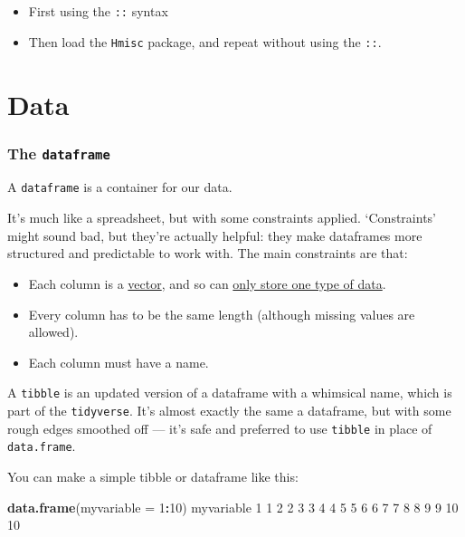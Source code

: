 \documentclass[]{article}
\newenvironment{Shaded}{\begin{snugshade}}{\end{snugshade}}
\newcommand{\DataTypeTok}[1]{\textcolor[rgb]{0.13,0.29,0.53}{#1}}
\newcommand{\DecValTok}[1]{\textcolor[rgb]{0.00,0.00,0.81}{#1}}
\newcommand{\KeywordTok}[1]{\textcolor[rgb]{0.13,0.29,0.53}{\textbf{#1}}}
\newcommand{\NormalTok}[1]{#1}
\newcommand{\OperatorTok}[1]{\textcolor[rgb]{0.81,0.36,0.00}{\textbf{#1}}}
\providecommand{\tightlist}{%
  \setlength{\itemsep}{0pt}\setlength{\parskip}{0pt}}
\begin{document}
\begin{itemize}
\tightlist
\item
  First using the \texttt{::} syntax
\item
  Then load the \texttt{Hmisc} package, and repeat without using the \texttt{::}.
\end{itemize}

\hypertarget{data}{%
\part{Data}\label{data}}

\hypertarget{datasets-dataframes}{%
\section{\texorpdfstring{The \texttt{dataframe}}{The dataframe}}\label{datasets-dataframes}}

A \texttt{dataframe} is a container for our data.

It's much like a spreadsheet, but with some constraints applied. `Constraints'
might sound bad, but they're actually helpful: they make dataframes more
structured and predictable to work with. The main constraints are that:

\begin{itemize}
\item
  Each column is a \protect\hyperlink{vectors-and-lists}{vector}, and so can
  \protect\hyperlink{vectors-and-lists}{only store one type of data}.
\item
  Every column has to be the same length (although missing values are
  allowed).
\item
  Each column must have a name.
\end{itemize}

A \texttt{tibble} is an updated version of a dataframe with a whimsical name, which is
part of the \texttt{tidyverse}. It's almost exactly the same a dataframe, but with some
rough edges smoothed off --- it's safe and preferred to use \texttt{tibble} in place of
\texttt{data.frame}.

You can make a simple tibble or dataframe like this:

\begin{Shaded}
\begin{Highlighting}[]
\KeywordTok{data.frame}\NormalTok{(}\DataTypeTok{myvariable =} \DecValTok{1}\OperatorTok{:}\DecValTok{10}\NormalTok{)}
\NormalTok{   myvariable}
\DecValTok{1}           \DecValTok{1}
\DecValTok{2}           \DecValTok{2}
\DecValTok{3}           \DecValTok{3}
\DecValTok{4}           \DecValTok{4}
\DecValTok{5}           \DecValTok{5}
\DecValTok{6}           \DecValTok{6}
\DecValTok{7}           \DecValTok{7}
\DecValTok{8}           \DecValTok{8}
\DecValTok{9}           \DecValTok{9}
\DecValTok{10}         \DecValTok{10}
\end{Highlighting}
\end{Shaded}
\end{document}

